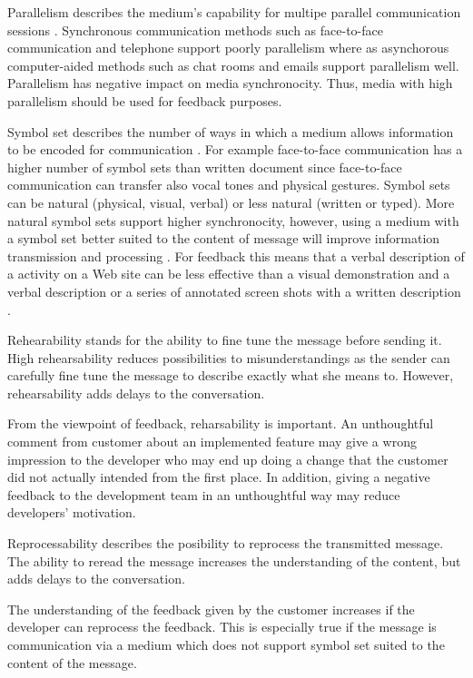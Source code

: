 \documentclass[conference]{IEEEtran}
\begin{document}
Parallelism describes the medium's capability for multipe parallel communication sessions \cite{2008dennis}. Synchronous communication methods such as face-to-face communication and telephone support poorly parallelism where as asynchorous computer-aided methods such as chat rooms and emails support parallelism well. Parallelism has negative impact on media synchronocity. Thus, media with high parallelism should be used for feedback purposes. \cite{2008dennis}

Symbol set describes the number of ways in which a medium allows information to be encoded for communication \cite{2008dennis}. For example face-to-face communication has a higher number of symbol sets than written document since face-to-face communication can transfer also vocal tones and physical gestures. Symbol sets can be natural (physical, visual, verbal) or less natural (written or typed). More natural symbol sets support higher synchronocity, however, using a medium with a symbol set better suited to the content of message will improve information transmission and processing \cite{2008dennis}. For feedback this means that a verbal description of a activity on a Web site can be less effective than a visual demonstration and a verbal description or a series of annotated screen shots with a written description \cite{2008dennis}.

Rehearability stands for the ability to fine tune the message before sending it. High rehearsability reduces possibilities to misunderstandings as the sender can carefully fine tune the message to describe exactly what she means to. However, rehearsability adds delays to the conversation. \cite{2008dennis} 

From the viewpoint of feedback, reharsability is important. An unthoughtful comment from customer about an implemented feature may give a wrong impression to the developer who may end up doing a change that the customer did not actually intended from the first place. In addition, giving a negative feedback to the development team in an unthoughtful way may reduce developers' motivation.

Reprocessability describes the posibility to reprocess the transmitted message. The ability to reread the message increases the understanding of the content, but adds delays to the conversation. \cite{2008dennis}

The understanding of the feedback given by the customer increases if the developer can reprocess the feedback. This is especially true if the message is communication via a medium which does not support symbol set suited to the content of the message. 
\end{document}
